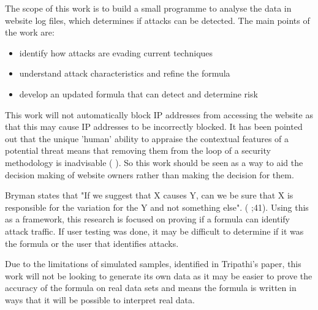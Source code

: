The scope of this work is to build a small programme to analyse the data in website log files, which determines if attacks can be detected. The main points of the work are:
\begin{itemize}
    \item identify how attacks are evading current techniques 
    \item understand attack characteristics and refine the formula
    \item develop an updated formula that can detect and determine risk
\end{itemize}

This work will not automatically block IP addresses from accessing the website as that this may cause IP addresses to be incorrectly blocked. It has been pointed out that the unique 'human' ability to appraise the contextual features of a potential threat means that removing them from the loop of a security methodology is inadvisable (\cite{TargetedCyberSecurity} ). So this work should be seen as a way to aid the decision making of website owners rather than making the decision for them. 


Bryman states that  "If we suggest that X causes Y, can we be sure that X is responsible for the variation for the Y and not something else". (\citeauthor{bryman_2016} \citeyear{bryman_2016};41). Using this as a framework, this research is focused on proving if a formula can identify attack traffic. If user testing was done, it may be difficult to determine if it was the formula or the user that identifies attacks.

 Due to the limitations of simulated samples, identified in Tripathi's paper, this work will not be looking to generate its own data as it may be easier to prove the accuracy of the formula on real data sets and  means the formula is written in ways that it will be possible to interpret real data.